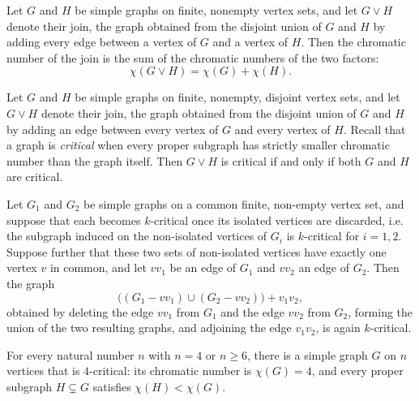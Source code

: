 \begin{theorem}
\label{SimpleGraph.chromaticNumber_join}
\leanok
{}
Let $G$ and $H$ be simple graphs on finite, nonempty vertex sets, and let $G \vee H$
denote their join, the graph obtained from the disjoint union of $G$ and $H$ by adding
every edge between a vertex of $G$ and a vertex of $H$. Then the chromatic number of the
join is the sum of the chromatic numbers of the two factors: \[ \chi(G \vee H) = \chi(G)
+ \chi(H). \]
\end{theorem}

\begin{theorem}
\label{SimpleGraph.join_isCritical_iff}
\leanok
{}
Let $G$ and $H$ be simple graphs on finite, nonempty, disjoint vertex sets, and let $G
\vee H$ denote their join, the graph obtained from the disjoint union of $G$ and $H$ by
adding an edge between every vertex of $G$ and every vertex of $H$. Recall that a graph
is \emph{critical} when every proper subgraph has strictly smaller chromatic number than
the graph itself. Then $G \vee H$ is critical if and only if both $G$ and $H$ are
critical.
\end{theorem}

\begin{theorem}
\label{SimpleGraph.hajos_construction}
\leanok
{}
Let $G_1$ and $G_2$ be simple graphs on a common finite, non-empty vertex set, and
suppose that each becomes $k$-critical once its isolated vertices are discarded, i.e.
the subgraph induced on the non-isolated vertices of $G_i$ is $k$-critical for $i = 1,
2$. Suppose further that these two sets of non-isolated vertices have exactly one vertex
$v$ in common, and let $vv_1$ be an edge of $G_1$ and $vv_2$ an edge of $G_2$. Then the
graph
\[
\bigl((G_1 - vv_1) \cup (G_2 - vv_2)\bigr) + v_1v_2,
\]
obtained by deleting the edge $vv_1$ from $G_1$ and the edge $vv_2$ from $G_2$, forming
the union of the two resulting graphs, and adjoining the edge $v_1v_2$, is again
$k$-critical.
\end{theorem}

\begin{theorem}
\label{SimpleGraph.exists_isKCritical_four}
\leanok
{}
For every natural number $n$ with $n = 4$ or $n \ge 6$, there is a simple graph $G$ on
$n$ vertices that is $4$-critical: its chromatic number is $\chi(G) = 4$, and every
proper subgraph $H \subsetneq G$ satisfies $\chi(H) < \chi(G)$.
\end{theorem}

